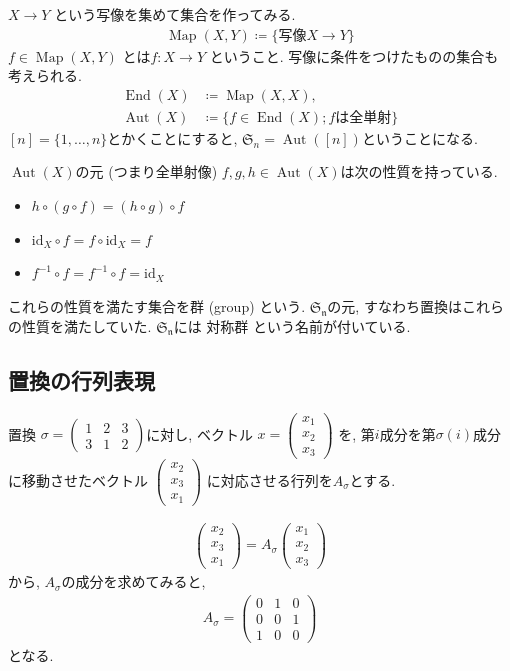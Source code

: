\documentclass[11pt, a4paper, dvipdfmx]{jsarticle}
\theoremstyle{definition}
\newcommand{\Map}{\mathop{\mathrm{Map}}\nolimits}
\newcommand{\End}{\mathop{\mathrm{End}}\nolimits}
\newcommand{\Aut}{\mathop{\mathrm{Aut}}\nolimits}
\newcommand{\id}{\mathrm{id}}
\theoremstyle{mystyle}
\numberwithin{equation}{section} %
\begin{document}
$X\to Y$ という写像を集めて集合を作ってみる. 
\begin{align*}
    \Map(X,Y)\coloneqq \{\text{写像} X\to Y \}
\end{align*}
$f\in \Map(X,Y)$ とは$f\colon X \to Y$ ということ. 
写像に条件をつけたものの集合も考えられる. 
\begin{align*}
    \End(X)&\coloneqq \Map(X,X), \\
    \Aut(X)&\coloneqq \{f \in \End(X); \text{$f$は全単射}\}
\end{align*}
$[n] = \{1,\ldots,n\}$とかくことにすると, 
$\mathfrak{S}_n = \Aut([n])$ということになる. 

$\Aut(X)$の元 (つまり全単射像) 
$f,g,h\in \Aut(X)$は次の性質を持っている. 
\begin{itemize}
    \item $h\circ (g\circ f) = (h\circ g)\circ f$
    \item $\id_X \circ f = f \circ \id_X = f$
    \item $f^{-1}\circ f = f^{-1} \circ f = \id_X$
\end{itemize}
これらの性質を満たす集合を群 (group) という. 
$\mathfrak{S_n}$の元, すなわち置換はこれらの性質を満たしていた. 
$\mathfrak{S_n}$には 対称群 という名前が付いている. 


\subsection{置換の行列表現}

置換 $\sigma = \begin{pmatrix}
    1 & 2 & 3\\
    3 & 1 & 2
\end{pmatrix}$に対し, 
ベクトル 
$x = 
\begin{pmatrix}
    x_1\\x_2\\x_3
\end{pmatrix}$
を, 第$i$成分を第$\sigma(i)$成分に移動させたベクトル
$\begin{pmatrix}
    x_2\\x_3\\x_1    
\end{pmatrix}$
に対応させる行列を$A_\sigma$とする. 

\begin{align*}
    \begin{pmatrix}
        x_2\\x_3\\x_1    
    \end{pmatrix} = A_\sigma \begin{pmatrix}
        x_1\\x_2\\x_3    
    \end{pmatrix}
\end{align*}
から, $A_\sigma$の成分を求めてみると, 
\begin{align*}
    A_\sigma = 
    \begin{pmatrix}
        0 & 1 & 0 \\
        0 & 0 & 1 \\
        1 & 0 & 0
    \end{pmatrix}
\end{align*}
となる. 
\end{document}
